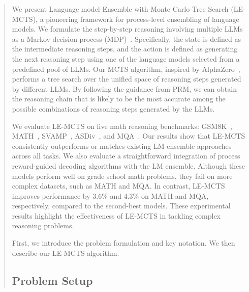 \documentclass[11pt]{article}
\begin{document}
\begin{abstract}
We present Language model Ensemble with Monte Carlo Tree Search (LE-MCTS), a pioneering framework for process-level ensembling of language models. 
We formulate the step-by-step reasoning involving multiple LLMs as a Markov decision process (MDP)~\citep{bellman-etal-1957-mdp}. 
Specifically, the state is defined as the intermediate reasoning steps, and the action is defined as generating the next reasoning step using one of the language models selected from a predefined pool of LLMs.
Our MCTS algorithm, inspired by AlphaZero~\citep{silver-etal-2020-alphazero}, performs a tree search over the unified space of reasoning steps generated by different LLMs. 
By following the guidance from PRM, we can obtain the reasoning chain that is likely to be the most accurate among the possible combinations of reasoning steps generated by the LLMs.

We evaluate LE-MCTS on five math reasoning benchmarks: GSM8K~\citep{cobbe-etal-2021-gsm8k}, MATH~\citep{hendrycks-etal-2021-math}, SVAMP~\cite{patel-etal-2021-nlp}, ASDiv~\cite{miao-etal-2020-diverse}, and MQA~\cite{amini-etal-2019-mqa}. 
Our results show that LE-MCTS consistently outperforms or matches existing LM ensemble approaches across all tasks. 
We also evaluate a straightforward integration of process reward-guided decoding algorithms with the LM ensemble. 
Although these models perform well on grade school math problems, they fail on more complex datasets, such as MATH and MQA. 
In contrast, LE-MCTS improves performance by 3.6\% and 4.3\% on MATH and MQA, respectively, compared to the second-best models.
These experimental results highlight the effectiveness of LE-MCTS in tackling complex reasoning problems.

First, we introduce the problem formulation and key notation. We then describe our LE-MCTS algorithm. 

\subsection{Problem Setup}
\label{text:method:setup}


\end{abstract}
\end{document}
